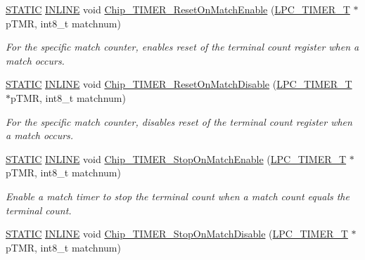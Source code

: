 \begin{DoxyCompactItemize}
\hyperlink{group___l_p_c___types___public___macros_ga10b2d890d871e1489bb02b7e70d9bdfb}{S\+T\+A\+T\+IC} \hyperlink{spifi__18xx__43xx_8h_a2eb6f9e0395b47b8d5e3eeae4fe0c116}{I\+N\+L\+I\+NE} void \hyperlink{group___t_i_m_e_r__18_x_x__43_x_x_ga4b8a551b290e9f70ba8b8569e2937f58}{Chip\+\_\+\+T\+I\+M\+E\+R\+\_\+\+Reset\+On\+Match\+Enable} (\hyperlink{struct_l_p_c___t_i_m_e_r___t}{L\+P\+C\+\_\+\+T\+I\+M\+E\+R\+\_\+T} $\ast$p\+T\+MR, int8\+\_\+t matchnum)
\begin{DoxyCompactList}\small\item\em For the specific match counter, enables reset of the terminal count register when a match occurs. \end{DoxyCompactList}\item 
\hyperlink{group___l_p_c___types___public___macros_ga10b2d890d871e1489bb02b7e70d9bdfb}{S\+T\+A\+T\+IC} \hyperlink{spifi__18xx__43xx_8h_a2eb6f9e0395b47b8d5e3eeae4fe0c116}{I\+N\+L\+I\+NE} void \hyperlink{group___t_i_m_e_r__18_x_x__43_x_x_gae203cf1a04cbbf63e966de3a5bd9c29e}{Chip\+\_\+\+T\+I\+M\+E\+R\+\_\+\+Reset\+On\+Match\+Disable} (\hyperlink{struct_l_p_c___t_i_m_e_r___t}{L\+P\+C\+\_\+\+T\+I\+M\+E\+R\+\_\+T} $\ast$p\+T\+MR, int8\+\_\+t matchnum)
\begin{DoxyCompactList}\small\item\em For the specific match counter, disables reset of the terminal count register when a match occurs. \end{DoxyCompactList}\item 
\hyperlink{group___l_p_c___types___public___macros_ga10b2d890d871e1489bb02b7e70d9bdfb}{S\+T\+A\+T\+IC} \hyperlink{spifi__18xx__43xx_8h_a2eb6f9e0395b47b8d5e3eeae4fe0c116}{I\+N\+L\+I\+NE} void \hyperlink{group___t_i_m_e_r__18_x_x__43_x_x_gaf76a0a1282598f976f04c00595b6332c}{Chip\+\_\+\+T\+I\+M\+E\+R\+\_\+\+Stop\+On\+Match\+Enable} (\hyperlink{struct_l_p_c___t_i_m_e_r___t}{L\+P\+C\+\_\+\+T\+I\+M\+E\+R\+\_\+T} $\ast$p\+T\+MR, int8\+\_\+t matchnum)
\begin{DoxyCompactList}\small\item\em Enable a match timer to stop the terminal count when a match count equals the terminal count. \end{DoxyCompactList}\item 
\hyperlink{group___l_p_c___types___public___macros_ga10b2d890d871e1489bb02b7e70d9bdfb}{S\+T\+A\+T\+IC} \hyperlink{spifi__18xx__43xx_8h_a2eb6f9e0395b47b8d5e3eeae4fe0c116}{I\+N\+L\+I\+NE} void \hyperlink{group___t_i_m_e_r__18_x_x__43_x_x_gae1be576a72246ab2255f735245fb49a7}{Chip\+\_\+\+T\+I\+M\+E\+R\+\_\+\+Stop\+On\+Match\+Disable} (\hyperlink{struct_l_p_c___t_i_m_e_r___t}{L\+P\+C\+\_\+\+T\+I\+M\+E\+R\+\_\+T} $\ast$p\+T\+MR, int8\+\_\+t matchnum)

\end{DoxyCompactItemize}
